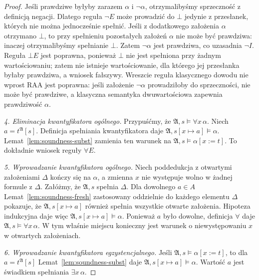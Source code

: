 \begin{proof}
Jeśli prawdziwe byłyby zarazem $\alpha$ i $\neg\alpha$,
otrzymalibyśmy sprzeczność z definicją negacji.
Dlatego reguła $\neg E$ może prowadzić do $\bot$
jedynie z przesłanek, których nie można jednocześnie spełnić.
Jeśli z dodatkowego założenia $\alpha$ otrzymano $\bot$,
to przy spełnieniu pozostałych założeń $\alpha$ nie może być
prawdziwa: inaczej otrzymalibyśmy spełnianie $\bot$.
Zatem $\neg\alpha$ jest prawdziwa, co uzasadnia $\neg I$.
Reguła $\bot E$ jest poprawna, ponieważ $\bot$ nie jest
spełniona przy żadnym wartościowaniu; zatem nie istnieje
wartościowanie, dla którego jej przesłanka byłaby prawdziwa,
a wniosek fałszywy. Wreszcie reguła klasycznego dowodu
nie wprost $\mathrm{RAA}$ jest poprawna: jeśli założenie
$\neg\alpha$ prowadziłoby do sprzeczności, nie może być
prawdziwe, a klasyczna semantyka dwuwartościowa
zapewnia prawdziwość $\alpha$.

\smallskip
\emph{4. Eliminacja kwantyfikatora ogólnego.}
Przypuśćmy, że $\mathfrak A,s\models\forall x\,\alpha$.
Niech $a=t^{\mathfrak A}[s]$. Definicja spełniania
kwantyfikatora daje
$\mathfrak A,s[x\mapsto a]\models\alpha$.
Lemat~\ref{lem:soundness-subst} zamienia ten warunek
na $\mathfrak A,s\models\alpha[x:=t]$.
To dokładnie wniosek reguły $\forall E$.

\smallskip
\emph{5. Wprowadzanie kwantyfikatora ogólnego.}
Niech poddedukcja z otwartymi założeniami $\Delta$
kończy się na $\alpha$, a zmienna $x$ nie występuje
wolno w żadnej formule z $\Delta$.
Załóżmy, że $\mathfrak A,s$ spełnia $\Delta$.
Dla dowolnego $a\in A$ Lemat~\ref{lem:soundness-fresh}
zastosowany oddzielnie do każdego elementu $\Delta$
pokazuje, że $\mathfrak A,s[x\mapsto a]$ również spełnia
wszystkie otwarte założenia. Hipoteza indukcyjna daje więc
$\mathfrak A,s[x\mapsto a]\models\alpha$.
Ponieważ $a$ było dowolne, definicja $\forall$ daje
$\mathfrak A,s\models\forall x\,\alpha$.
W tym właśnie miejscu konieczny jest warunek o niewystępowaniu
$x$ w otwartych założeniach.

\smallskip
\emph{6. Wprowadzanie kwantyfikatora egzystencjalnego.}
Jeśli $\mathfrak A,s\models\alpha[x:=t]$,
to dla $a=t^{\mathfrak A}[s]$ Lemat~\ref{lem:soundness-subst}
daje $\mathfrak A,s[x\mapsto a]\models\alpha$.
Wartość $a$ jest świadkiem spełniania $\exists x\,\alpha$.


\end{proof}
